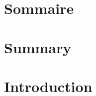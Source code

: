 \documentclass[12pt,initial,twoside,maitrise]{dms}
\numberwithin{equation}{section}
\numberwithin{table}{chapter}
\numberwithin{figure}{chapter}
\begin{document}

    \francais

    \chapter*{Sommaire}


    \anglais
    \chapter*{Summary}


    \francais
    \cleardoublepage
    \tableofcontents
    \cleardoublepage
    \listoftables
    \cleardoublepage
    \listoffigures


    \NoChapterPageNumber
    \cleardoublepage

    \chapter*{Introduction}
\end{document}
